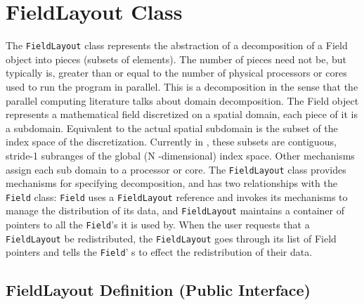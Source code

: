 \chapter{FieldLayout Class}
\label{sec:flcl}
The \texttt{FieldLayout} class represents the abstraction of a decomposition of a Field object into pieces (subsets of elements). The number of pieces need not be, but typically is, greater than or equal to the number of physical processors or cores used to run the \ippl program in parallel. This is a decomposition in the sense that the parallel computing literature talks about domain decomposition. The Field object represents a mathematical 
field discretized on a spatial domain, each piece of it is a subdomain. Equivalent to the actual spatial subdomain is the subset of the index space of the discretization. Currently in \ippl, these subsets are contiguous, stride-1 subranges of the global (N -dimensional) index space. Other \ippl mechanisms assign each sub domain to a processor or core. The \texttt{FieldLayout} class provides mechanisms for specifying decomposition, and has two relationships with the \texttt{Field} class: \texttt{Field} uses a \texttt{FieldLayout} reference and invokes its mechanisms to manage the distribution of its data, and \texttt{FieldLayout} maintains a container of pointers to all the 
\texttt{Field}'s it is used by. When the user requests that a \texttt{FieldLayout} be redistributed, the \texttt{FieldLayout} goes through its list of Field pointers and tells the 
\texttt{Field}' s to effect the redistribution of their data. 
\section{FieldLayout Definition (Public Interface)} 

